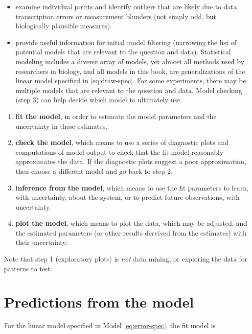 \documentclass[]{book}
\providecommand{\tightlist}{%
  \setlength{\itemsep}{0pt}\setlength{\parskip}{0pt}}
\begin{document}
\begin{itemize}
\tightlist
\item
  examine individual points and identify outliers that are likely due to data transcription errors or measurement blunders (not simply odd, but biologically plausible measures).
\item
  provide useful information for initial model filtering (narrowing the list of potential models that are relevant to the question and data). Statistical modeling includes a diverse array of models, yet almost all methods used by researchers in biology, and all models in this book, are generalizations of the linear model specified in \eqref{eq:draw-spec}. For some experiments, there may be multiple models that are relevant to the question and data. Model checking (step 3) can help decide which model to ultimately use.
\end{itemize}

\begin{enumerate}
\def\labelenumi{\arabic{enumi}.}
\setcounter{enumi}{1}
\tightlist
\item
  \textbf{fit the model}, in order to estimate the model parameters and the uncertainty in these estimates.
\item
  \textbf{check the model}, which means to use a series of diagnostic plots and computations of model output to check that the fit model reasonably approximates the data. If the diagnostic plots suggest a poor approximation, then choose a different model and go back to step 2.
\item
  \textbf{inference from the model}, which means to use the fit parameters to learn, with uncertainty, about the system, or to predict future observations, with uncertainty.
\item
  \textbf{plot the model}, which means to plot the data, which may be adjusted, and the estimated parameters (or other results dervived from the estimates) with their uncertainty.
\end{enumerate}

Note that step 1 (exploratory plots) is \emph{not} data mining, or exploring the data for patterns to test.

\hypertarget{predictions-from-the-model}{%
\section{Predictions from the model}\label{predictions-from-the-model}}

For the linear model specified in Model \eqref{eq:error-spec}, the fit model is
\end{document}
